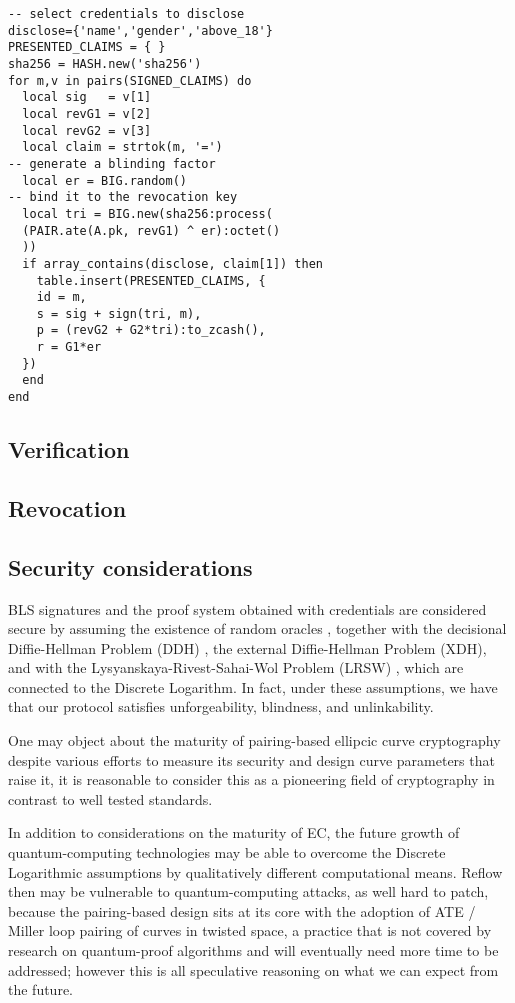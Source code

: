 \documentclass[conference]{IEEEtran}
\begin{document}
\begin{lstlisting}[style=lua,caption={Holder presents credentials}]
-- select credentials to disclose
disclose={'name','gender','above_18'}
PRESENTED_CLAIMS = { }
sha256 = HASH.new('sha256')
for m,v in pairs(SIGNED_CLAIMS) do
  local sig   = v[1]
  local revG1 = v[2]
  local revG2 = v[3]
  local claim = strtok(m, '=')
-- generate a blinding factor
  local er = BIG.random()
-- bind it to the revocation key
  local tri = BIG.new(sha256:process(
  (PAIR.ate(A.pk, revG1) ^ er):octet()
  ))
  if array_contains(disclose, claim[1]) then
	table.insert(PRESENTED_CLAIMS, {
    id = m,
    s = sig + sign(tri, m),
    p = (revG2 + G2*tri):to_zcash(),
    r = G1*er
  })
  end
end
\end{lstlisting}

\subsection{Verification}
\subsection{Revocation}
\subsection{Security considerations}

BLS signatures and the proof system obtained with credentials are
considered secure by assuming the existence of random oracles
\cite{random-oracle}, together with the decisional Diffie-Hellman
Problem (DDH) \cite{DDH-problem}, the external Diffie-Hellman Problem
(XDH), and with the Lysyanskaya-Rivest-Sahai-Wol Problem (LRSW)
\cite{lrsw-assumption}, which are connected to the Discrete
Logarithm. In fact, under these assumptions, we have that our protocol
satisfies unforgeability, blindness, and unlinkability.

One may object about the maturity of pairing-based ellipcic curve
cryptography despite various efforts to measure its security and
design curve parameters that raise it, it is reasonable to consider
this as a pioneering field of cryptography in contrast to well tested
standards.

In addition to considerations on the maturity of EC, the future growth
of quantum-computing technologies may be able to overcome the Discrete
Logarithmic assumptions by qualitatively different computational
means. Reflow then may be vulnerable to quantum-computing attacks, as
well hard to patch, because the pairing-based design sits at its core
with the adoption of ATE / Miller loop pairing of curves in twisted
space, a practice that is not covered by research on quantum-proof
algorithms and will eventually need more time to be addressed; however
this is all speculative reasoning on what we can expect from the
future.
\end{document}
